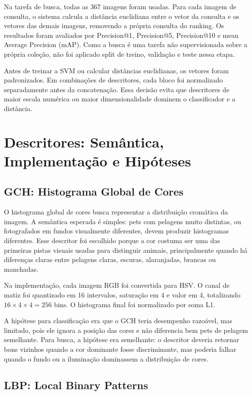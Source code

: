 \documentclass[12pt,a4paper]{article}
\begin{document}
Na tarefa de busca, todas as 367 imagens foram usadas. Para cada imagem de consulta, o sistema calcula a distância euclidiana entre o vetor da consulta e os vetores das demais imagens, removendo a própria consulta do ranking. Os resultados foram avaliados por Precision@1, Precision@5, Precision@10 e mean Average Precision (mAP). Como a busca é uma tarefa não supervisionada sobre a própria coleção, não foi aplicado split de treino, validação e teste nessa etapa.

Antes de treinar a SVM ou calcular distâncias euclidianas, os vetores foram padronizados. Em combinações de descritores, cada bloco foi normalizado separadamente antes da concatenação. Essa decisão evita que descritores de maior escala numérica ou maior dimensionalidade dominem o classificador e a distância.

\section{Descritores: Semântica, Implementação e Hipóteses}

\subsection{GCH: Histograma Global de Cores}

O histograma global de cores busca representar a distribuição cromática da imagem. A semântica esperada é simples: pets com pelagens muito distintas, ou fotografados em fundos visualmente diferentes, devem produzir histogramas diferentes. Esse descritor foi escolhido porque a cor costuma ser uma das primeiras pistas visuais usadas para distinguir animais, principalmente quando há diferenças claras entre pelagens claras, escuras, alaranjadas, brancas ou manchadas.

Na implementação, cada imagem RGB foi convertida para HSV. O canal de matiz foi quantizado em 16 intervalos, saturação em 4 e valor em 4, totalizando \(16 \times 4 \times 4 = 256\) bins. O histograma final foi normalizado por soma L1.

A hipótese para classificação era que o GCH teria desempenho razoável, mas limitado, pois ele ignora a posição das cores e não diferencia bem pets de pelagem semelhante. Para busca, a hipótese era semelhante: o descritor deveria retornar bons vizinhos quando a cor dominante fosse discriminante, mas poderia falhar quando o fundo ou a iluminação dominassem a distribuição de cores.

\subsection{LBP: Local Binary Patterns}
\end{document}

